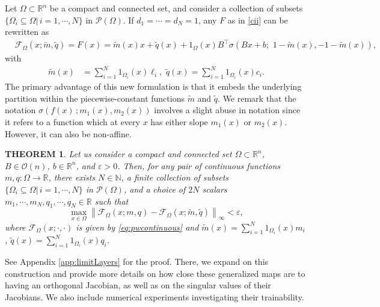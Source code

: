 \documentclass{article}
\newcommand{\R}{\mathbb{R}}
\theoremstyle{plain}
\newtheorem{theorem}{THEOREM}[section]
\theoremstyle{definition}
\theoremstyle{definition}
\theoremstyle{remark}
\theoremstyle{definition}
\theoremstyle{definition}
\theoremstyle{remark}
\numberwithin{equation}{section}
\begin{document}
Let $\Omega\subset\mathbb{R}^n$ be a compact and connected set, and consider a collection of subsets $\{\Omega_i\subseteq\Omega|\,i=1,\cdots,N\}$ in $\mathcal{P}(\Omega)$. If $d_1=\cdots=d_N = 1$, any $F$ as in \eqref{cii} can be rewritten as
\begin{align}
&\mathcal{F}_\Omega(x; \widetilde{m}, \widetilde{q})=F(x) = \widetilde{m}(x)x + \widetilde{q}(x) + 1_{\Omega}(x)B^\top \sigma(Bx+b;\,\,1-\widetilde{m}(x),-1-\widetilde{m}(x)),\label{eq:pwcontinuous}
\end{align}
with
\begin{align}
\widetilde{m}(x)&=\sum_{i=1}^N 1_{\Omega_i}(x)\ell_i,\,\,\widetilde{q}(x)=\sum_{i=1}^N 1_{\Omega_i}(x) c_i. \nonumber
\end{align}
The primary advantage of this new formulation is that it embeds the underlying partition within the piecewise-constant functions $\tilde{m}$ and $\tilde{q}$. We remark that the notation $\sigma(f(x)\,;m_1(x),m_2(x))$ involves a slight abuse in notation since it refers to a function which at every $x$ has either slope $m_1(x)$ or $m_2(x)$. However, it can also be non-affine.

\begin{theorem}\label{thm:density}
Let us consider a compact and connected set $\Omega\subset\R^n$, $B\in\mathcal{O}(n)$, $b\in\R^n$, and $\varepsilon>0$. Then, for any pair of continuous functions $m,q:\Omega\to\R$, there exists $N\in\mathbb{N}$, a finite collection of subsets $\{\Omega_i\subseteq\Omega|\,i=1,\cdots,N\}$ in $\mathcal{P}(\Omega)$, and a choice of $2N$ scalars $m_1,\cdots,m_N,q_1,\cdots,q_N\in\R$ such that
\[
\max_{x\in\Omega}\left\|\mathcal{F}_\Omega(x; m, q) - \mathcal{F}_\Omega(x; \widetilde{m}, \widetilde{q})\right\|_{\infty} < \varepsilon,
\]
where $\mathcal{F}_\Omega(x; \cdot, \cdot)$ is given by \eqref{eq:pwcontinuous} and $\widetilde{m}(x) = \sum_{i=1}^N 1_{\Omega_i}(x)m_i$, $\widetilde{q}(x) = \sum_{i=1}^N 1_{\Omega_i}(x)q_i$.
\end{theorem}
See Appendix \ref{app:limitLayers} for the proof. There, we expand on this construction and provide more details on how close these generalized maps are to having an orthogonal Jacobian, as well as on the singular values of their Jacobians. We also include numerical experiments investigating their trainability.
\end{document}
